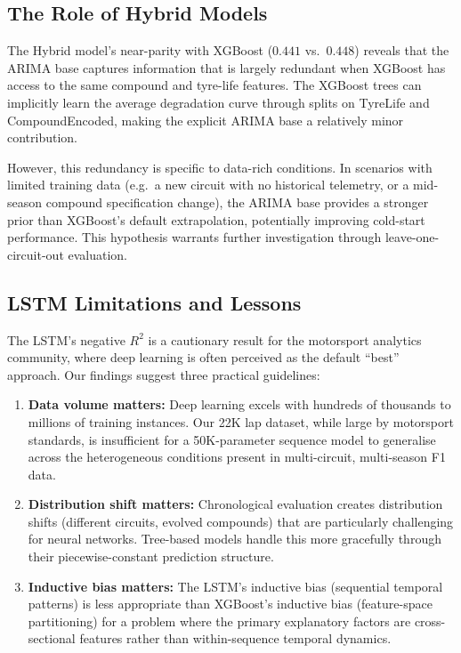 \documentclass[journal,twoside]{IEEEtran}
\begin{document}
\subsection{The Role of Hybrid Models}

The Hybrid model's near-parity with XGBoost ($0.441$ vs.\ $0.448$)
reveals that the ARIMA base captures information that is largely
redundant when XGBoost has access to the same compound and tyre-life
features.  The XGBoost trees can implicitly learn the average
degradation curve through splits on TyreLife and CompoundEncoded,
making the explicit ARIMA base a relatively minor contribution.

However, this redundancy is specific to data-rich conditions.  In
scenarios with limited training data (e.g.\ a new circuit with no
historical telemetry, or a mid-season compound specification change),
the ARIMA base provides a stronger prior than XGBoost's default
extrapolation, potentially improving cold-start performance.  This
hypothesis warrants further investigation through leave-one-circuit-out
evaluation.

\subsection{LSTM Limitations and Lessons}

The LSTM's negative $R^{2}$ is a cautionary result for the motorsport
analytics community, where deep learning is often perceived as the
default ``best'' approach.  Our findings suggest three practical
guidelines:

\begin{enumerate}
  \item \textbf{Data volume matters:}  Deep learning excels with
  hundreds of thousands to millions of training instances.  Our 22K lap
  dataset, while large by motorsport standards, is insufficient for a
  50K-parameter sequence model to generalise across the heterogeneous
  conditions present in multi-circuit, multi-season F1 data.

  \item \textbf{Distribution shift matters:}  Chronological evaluation
  creates distribution shifts (different circuits, evolved compounds)
  that are particularly challenging for neural networks.  Tree-based
  models handle this more gracefully through their piecewise-constant
  prediction structure.

  \item \textbf{Inductive bias matters:}  The LSTM's inductive bias
  (sequential temporal patterns) is less appropriate than XGBoost's
  inductive bias (feature-space partitioning) for a problem where the
  primary explanatory factors are cross-sectional features rather than
  within-sequence temporal dynamics.
\end{enumerate}
\end{document}
